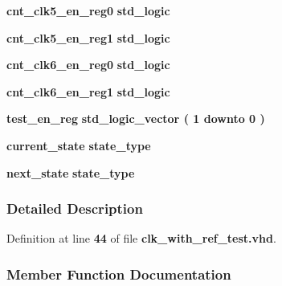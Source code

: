 \begin{DoxyCompactItemize}
{\bf cnt\+\_\+clk5\+\_\+en\+\_\+reg0} {\bfseries \textcolor{comment}{std\+\_\+logic}\textcolor{vhdlchar}{ }} 
\item 
{\bf cnt\+\_\+clk5\+\_\+en\+\_\+reg1} {\bfseries \textcolor{comment}{std\+\_\+logic}\textcolor{vhdlchar}{ }} 
\item 
{\bf cnt\+\_\+clk6\+\_\+en\+\_\+reg0} {\bfseries \textcolor{comment}{std\+\_\+logic}\textcolor{vhdlchar}{ }} 
\item 
{\bf cnt\+\_\+clk6\+\_\+en\+\_\+reg1} {\bfseries \textcolor{comment}{std\+\_\+logic}\textcolor{vhdlchar}{ }} 
\item 
{\bf test\+\_\+en\+\_\+reg} {\bfseries \textcolor{comment}{std\+\_\+logic\+\_\+vector}\textcolor{vhdlchar}{ }\textcolor{vhdlchar}{(}\textcolor{vhdlchar}{ }\textcolor{vhdlchar}{ } \textcolor{vhdldigit}{1} \textcolor{vhdlchar}{ }\textcolor{keywordflow}{downto}\textcolor{vhdlchar}{ }\textcolor{vhdlchar}{ } \textcolor{vhdldigit}{0} \textcolor{vhdlchar}{ }\textcolor{vhdlchar}{)}\textcolor{vhdlchar}{ }} 
\item 
{\bf current\+\_\+state} {\bfseries {\bfseries {\bf state\+\_\+type}} \textcolor{vhdlchar}{ }} 
\item 
{\bf next\+\_\+state} {\bfseries {\bfseries {\bf state\+\_\+type}} \textcolor{vhdlchar}{ }} 
\end{DoxyCompactItemize}


\subsubsection{Detailed Description}


Definition at line {\bf 44} of file {\bf clk\+\_\+with\+\_\+ref\+\_\+test.\+vhd}.



\subsubsection{Member Function Documentation}
